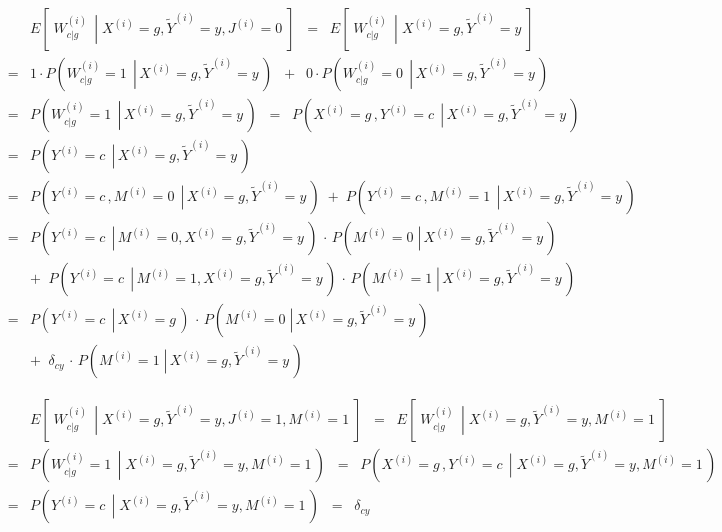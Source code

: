 \begin{eqnarray*}
&&
	E\!\left[\;\left.W^{(i)}_{c \vert g}\,\;\right\vert\;X^{(i)}=g,\widetilde{Y}^{(i)}=y,J^{(i)}=0\;\right]
\;\;=\;\;
	E\!\left[\;\left.W^{(i)}_{c \vert g}\,\;\right\vert\;X^{(i)}=g,\widetilde{Y}^{(i)}=y\;\right]
\\
&=&
	1 \cdot P\!\left(\left.W^{(i)}_{c \vert g} = 1\,\;\right\vert\,X^{(i)}=g,\widetilde{Y}^{(i)}=y\,\right)
	\;\;+\;\;
	0 \cdot P\!\left(\left.W^{(i)}_{c \vert g} = 0\,\;\right\vert\,X^{(i)}=g,\widetilde{Y}^{(i)}=y\,\right)
\\
&=&
	P\!\left(\left.W^{(i)}_{c \vert g} = 1\,\;\right\vert\,X^{(i)}=g,\widetilde{Y}^{(i)}=y\,\right)
\;\; = \;\;
	P\!\left(\left.X^{(i)} = g\,,Y^{(i)} = c\,\;\right\vert\,X^{(i)}=g,\widetilde{Y}^{(i)}=y\,\right)
\\
& = &
	P\!\left(\left.Y^{(i)} = c\,\;\right\vert\,X^{(i)}=g,\widetilde{Y}^{(i)}=y\,\right)
\\
&=&
	P\!\left(\left.Y^{(i)} = c\,,M^{(i)}=0\,\;\right\vert\,X^{(i)}=g,\widetilde{Y}^{(i)}=y\,\right)
	\; + \; P\!\left(\left.Y^{(i)} = c\,,M^{(i)}=1\,\;\right\vert\,X^{(i)}=g,\widetilde{Y}^{(i)}=y\,\right)
\\
&=&
	P\!\left(\left.Y^{(i)} = c\,\;\right\vert\,M^{(i)}=0,X^{(i)}=g,\widetilde{Y}^{(i)}=y\,\right)
	\,\cdot\,
	P\!\left(\left.M^{(i)}=0\;\right\vert\,X^{(i)}=g,\widetilde{Y}^{(i)}=y\,\right)
\\
&&
	+ \;\;
	P\!\left(\left.Y^{(i)} = c\,\;\right\vert\,M^{(i)}=1,X^{(i)}=g,\widetilde{Y}^{(i)}=y\,\right)
	\,\cdot\,
	P\!\left(\left.M^{(i)}=1\;\right\vert\,X^{(i)}=g,\widetilde{Y}^{(i)}=y\,\right)
\\
&=&
	P\!\left(\left.Y^{(i)} = c\,\;\right\vert\,X^{(i)}=g\,\right)
	\,\cdot\,
	P\!\left(\left.M^{(i)}=0\;\right\vert\,X^{(i)}=g,\widetilde{Y}^{(i)}=y\,\right)
\\
&&
	+ \;\;
	\delta_{cy}
	\,\cdot\,
	P\!\left(\left.M^{(i)}=1\;\right\vert\,X^{(i)}=g,\widetilde{Y}^{(i)}=y\,\right)
\end{eqnarray*}

\begin{eqnarray*}
&&
	E\!\left[\;\left.W^{(i)}_{c \vert g}\,\;\right\vert\;X^{(i)}=g,\widetilde{Y}^{(i)}=y,J^{(i)}=1,M^{(i)}=1\;\right]
\;\;=\;\;
	E\!\left[\;\left.W^{(i)}_{c \vert g}\,\;\right\vert\;X^{(i)}=g,\widetilde{Y}^{(i)}=y,M^{(i)}=1\;\right]
\\
&=&
	P\!\left(\left.W^{(i)}_{c \vert g}=1\,\;\right\vert\;X^{(i)}=g,\widetilde{Y}^{(i)}=y,M^{(i)}=1\,\right)
\;\;=\;\;
	P\!\left(\left.X^{(i)} = g\,,Y^{(i)} = c\,\;\right\vert\;X^{(i)}=g,\widetilde{Y}^{(i)}=y,M^{(i)}=1\,\right)
\\
&=&
	P\!\left(\left.Y^{(i)} = c\,\;\right\vert\;X^{(i)}=g,\widetilde{Y}^{(i)}=y,M^{(i)}=1\,\right)
	\;\; = \;\; \delta_{cy}
\end{eqnarray*}

